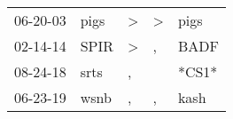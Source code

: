 \begin{supertabular}{lllll}
 06-20-03 &  pigs &  \textgreater &  \textgreater &   pigs \\
 02-14-14 &  SPIR &  \textgreater &             , &   BADF \\
 08-24-18 &  srts &             , &               &  *CS1* \\
 06-23-19 &  wsnb &             , &             , &   kash \\
\end{supertabular}
